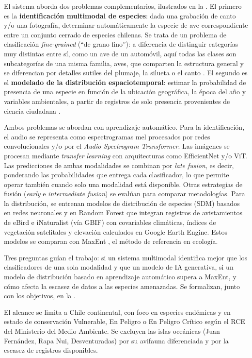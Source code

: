 El sistema aborda dos problemas complementarios, ilustrados en la
. El primero es la \textbf{identificación multimodal
de especies}: dada una grabación de canto y/o una fotografía, determinar
automáticamente la especie de ave correspondiente entre un conjunto cerrado de
especies chilenas. Se trata de un problema de clasificación \textit{fine-grained} (``de grano
fino''): a diferencia de distinguir categorías muy distintas entre sí, como
un ave de un automóvil, aquí todas las clases son subcategorías de una misma
familia, aves, que comparten la estructura general y se diferencian por
detalles sutiles del plumaje, la silueta o el canto
\citep{wei2022finegrained}. El segundo es el \textbf{modelado de la
distribución espaciotemporal}: estimar la probabilidad de presencia de una
especie en función de la ubicación geográfica, la época del año y variables
ambientales, a partir de registros de solo presencia provenientes de ciencia
ciudadana \citep{elith2009sdm}.

Ambos problemas se abordan con aprendizaje automático. Para la identificación, el audio se representa como espectrogramas mel
procesados por redes convolucionales y/o por el \textit{Audio Spectrogram
Transformer}. Las imágenes se procesan mediante \textit{transfer learning}
con arquitecturas como EfficientNet y/o ViT. Las predicciones de ambas
modalidades se combinan por \textit{late fusion}, es decir, ponderando las
probabilidades que entrega cada clasificador, lo que permite operar también
cuando solo una modalidad está disponible. Otras estrategias de fusión
(\textit{early} e \textit{intermediate fusion}) se evalúan para comparar
metodologías. Para la distribución, se entrenan modelos de distribución de
especies (SDM) basados en redes neuronales y en Random Forest que integran
registros de avistamientos de eBird e iNaturalist (vía GBIF) con covariables
climáticas, índices de vegetación satelitales y elevación calculados en
Google Earth Engine. Estos modelos se comparan con MaxEnt
\citep{phillips2006maxent}, el método de referencia en ecología.

Tres preguntas guían el trabajo: si un sistema multimodal identifica mejor
que los clasificadores de una sola modalidad y que un modelo de IA generativa,
si un modelo de distribución basado en aprendizaje automático supera a MaxEnt,
y cómo afecta la escasez de datos a las especies amenazadas. Se formalizan,
junto con los objetivos, en la .

El alcance se limita a Chile continental, con foco en especies endémicas y en
estado de conservación Vulnerable, En Peligro o En Peligro Crítico según el
RCE del Ministerio del Medio Ambiente. Se excluyen las islas oceánicas
(Juan Fernández, Rapa Nui, Desventuradas) por su avifauna diferenciada y por
la escasez de registros disponibles.

